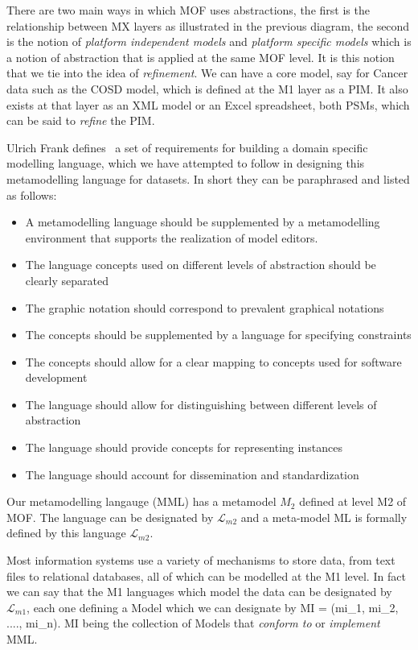 \documentclass{llncs}
\newcommand{\Lagr}{\mathcal{L}}
\begin{document}
	There are two main ways in which MOF uses abstractions, the first is the relationship between MX layers as illustrated in the previous diagram, the second is the notion of \emph{platform independent models} and \emph{platform specific models} which is a notion of abstraction that is applied at the same MOF level. It is this notion that we tie into the idea of \emph{refinement}. We can have a core model, say for Cancer data such as the COSD model, which is defined at the M1 layer as a PIM. It also exists at that layer as an XML model or an Excel spreadsheet, both PSMs, which can be said to \emph{refine} the PIM. 
	
	Ulrich Frank defines~\cite{Frank2013} a set of requirements for building a domain specific modelling language, which we have attempted to follow in designing this metamodelling language for datasets. In short they can be paraphrased and listed as follows:
	\begin{itemize}
		\item A metamodelling language should be supplemented by a metamodelling environment that supports the realization of model editors.
		\item The language concepts used on different levels of abstraction should be clearly separated
		\item The graphic notation should correspond to prevalent graphical notations
		\item The concepts should be supplemented by a language for specifying constraints
		\item The concepts should allow for a clear mapping to concepts used for software development
		\item The language should allow for distinguishing between different levels of abstraction
		\item The language should provide concepts for representing instances
		\item The language should account for dissemination and standardization
	\end{itemize}
	
	Our metamodelling langauge (MML) has a metamodel \textbf{$M_2$} defined at level M2 of MOF. The language can be designated by $\Lagr_{m2}$ and a meta-model ML is formally defined by this language $\Lagr_{m2}$.
	
	Most information systems use a variety of mechanisms to store data, from text files to relational databases, all of which can be modelled at the M1 level.  In fact we can say that the M1 languages which model the data can be designated by $\Lagr_{m1}$, each one defining a Model which we can designate by MI = (mi\_1, mi\_2, ...., mi\_n).  MI being the collection of Models that \emph{conform to} or \emph{implement} MML.  
	
\end{document}
